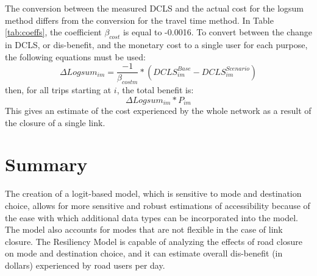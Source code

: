 The conversion between the measured DCLS and the actual cost for the logsum method differs from the conversion for the travel time method.
In Table \ref{tab:coeffs}, the coefficient \(\beta_{cost}\) is equal to -0.0016.
To convert between the change in DCLS, or dis-benefit, and the monetary cost to a
single user for each purpose, the following equations must be used:
\begin{equation}
  \Delta{Logsum_{im}} = \frac{-1}{\beta_{cost m}} *(DCLS^{Base}_{im} - DCLS^{Scenario}_{im})
\end{equation}
then, for all trips starting at \(i\), the total benefit is:
\begin{equation}
  \Delta{Logsum_{im}} * P_{im}
\end{equation}
This gives an estimate of the cost experienced by the whole network as a result
of the closure of a single link.

\section{Summary}

The creation of a logit-based model, which is sensitive to mode and destination
choice, allows for more sensitive and robust estimations of accessibility because
of the ease with which additional data types can be incorporated into the model. The
model also accounts for modes that are not flexible in the case of link
closure. The Resiliency Model is capable of analyzing the effects of
road closure on mode and destination choice, and it can estimate overall
dis-benefit (in dollars) experienced by road users per day.
